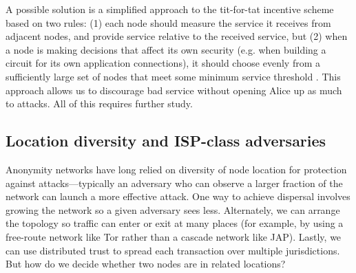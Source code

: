\documentclass{llncs}
\begin{document}

A possible solution is a simplified approach to the tit-for-tat
incentive scheme based on two rules: (1) each node should measure the
service it receives from adjacent nodes, and provide service relative
to the received service, but (2) when a node is making decisions that
affect its own security (e.g. when building a circuit for its own
application connections), it should choose evenly from a sufficiently
large set of nodes that meet some minimum service threshold
\cite{casc-rep}.  This approach allows us to discourage bad service
without opening Alice up as much to attacks.  All of this requires
further study.




\subsection{Location diversity and ISP-class adversaries}
\label{subsec:routing-zones}

Anonymity networks have long relied on diversity of node location for
protection against attacks---typically an adversary who can observe a
larger fraction of the network can launch a more effective attack. One
way to achieve dispersal involves growing the network so a given adversary
sees less. Alternately, we can arrange the topology so traffic can enter
or exit at many places (for example, by using a free-route network
like Tor rather than a cascade network like JAP). Lastly, we can use
distributed trust to spread each transaction over multiple jurisdictions.
But how do we decide whether two nodes are in related locations?
\end{document}

